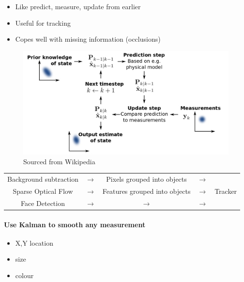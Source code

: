 \documentclass[paper=a4, fontsize=11pt]{article} %
\numberwithin{equation}{section} %
\numberwithin{figure}{section} %
\numberwithin{table}{section} %
\begin{document}
\begin{itemize}
\item Like predict, measure, update from earlier
\item Useful for tracking
\item Copes well with missing information (occlusions) 
\end{itemize}

\begin{figure}[h]
    \centering
\includegraphics[scale=0.3]{images/kalman}
\caption{Sourced from Wikipedia}
    \label{fig:kalman}
\end{figure}

\begin{center}

\begin{tabular}{| c  c  c  c | c |}
\hline
Background subtraction & $\rightarrow$ & Pixels grouped into objects & $\rightarrow$ & \multirow{3}{4em}{Tracker} \\ 
Sparse Optical Flow &  $\rightarrow$  & Features grouped into objects &  $\rightarrow$  & \\ 
Face Detection &   $\rightarrow$   &  $\rightarrow$  &   $\rightarrow$   & \\ \hline

\end{tabular}
\end{center}

\paragraph{Use Kalman to smooth any measurement}
\begin{itemize}
\item X,Y location
\item size
\item colour
\end{itemize}
\end{document}
